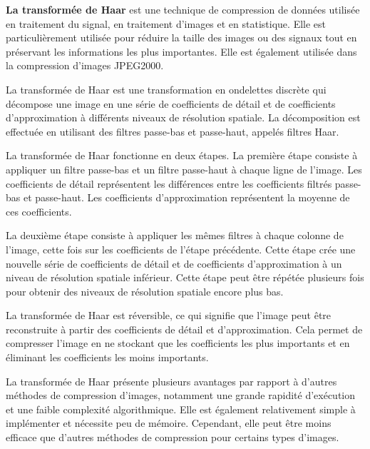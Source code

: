 \textbf{La transformée de Haar} est une technique de compression de données utilisée en traitement du signal, en traitement d'images et en statistique. Elle est particulièrement utilisée pour réduire la taille des images ou des signaux tout en préservant les informations les plus importantes. Elle est également utilisée dans la compression d'images JPEG2000.

La transformée de Haar est une transformation en ondelettes discrète qui décompose une image en une série de coefficients de détail et de coefficients d'approximation à différents niveaux de résolution spatiale.
La décomposition est effectuée en utilisant des filtres passe-bas et passe-haut, appelés filtres Haar.

La transformée de Haar fonctionne en deux étapes. La première étape consiste à appliquer un filtre passe-bas et un filtre passe-haut à chaque ligne de l'image. Les coefficients de détail représentent les différences entre les coefficients filtrés passe-bas et passe-haut. Les coefficients d'approximation représentent la moyenne de ces coefficients.

La deuxième étape consiste à appliquer les mêmes filtres à chaque colonne de l'image, cette fois sur les coefficients de l'étape précédente. Cette étape crée une nouvelle série de coefficients de détail et de coefficients d'approximation à un niveau de résolution spatiale inférieur. Cette étape peut être répétée plusieurs fois pour obtenir des niveaux de résolution spatiale encore plus bas.

La transformée de Haar est réversible, ce qui signifie que l'image peut être reconstruite à partir des coefficients de détail et d'approximation. Cela permet de compresser l'image en ne stockant que les coefficients les plus importants et en éliminant les coefficients les moins importants.

La transformée de Haar présente plusieurs avantages par rapport à d'autres méthodes de compression d'images, notamment une grande rapidité d'exécution et une faible complexité algorithmique. Elle est également relativement simple à implémenter et nécessite peu de mémoire. Cependant, elle peut être moins efficace que d'autres méthodes de compression pour certains types d'images.

